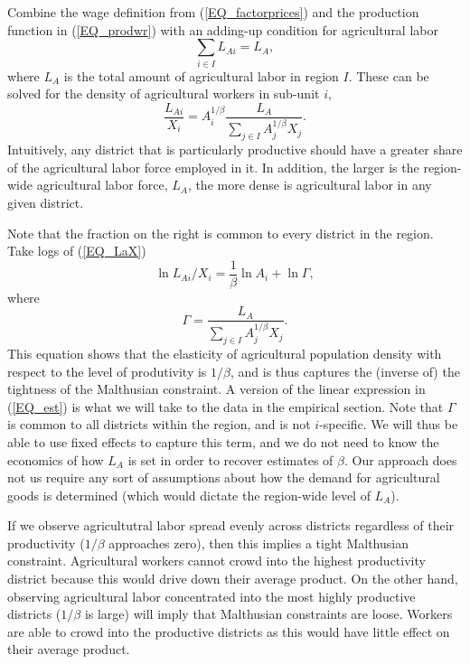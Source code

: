 \documentclass[11pt]{article}
\begin{document}
Combine the wage definition from (\ref{EQ_factorprices}) and the production function in (\ref{EQ_prodwr}) with an adding-up condition for agricultural labor 
\begin{equation}
\sum_{i\in I} L_{Ai} = L_A,
\end{equation}
where $L_A$ is the total amount of agricultural labor in region $I$. These can be solved for the density of agricultural workers in sub-unit $i$,
\begin{equation}
\frac{L_{Ai}}{X_i} = A_{i}^{1/\beta}\frac{L_A}{\sum_{j\in I} A_{j}^{1/\beta}X_{j}}. \label{EQ_LaX}
\end{equation}
Intuitively, any district that is particularly productive should have a greater share of the agricultural labor force employed in it. In addition, the larger is the region-wide agricultural labor force, $L_A$, the more dense is agricultural labor in any given district.

Note that the fraction on the right is common to every district in the region. Take logs of (\ref{EQ_LaX}) 
\begin{equation}
\ln L_{Ai}/X_i = \frac{1}{\beta} \ln A_{i} + \ln \Gamma, \label{EQ_est}
\end{equation}
where
\begin{equation}
    \Gamma = \frac{L_A}{\sum_{j\in I} A_{j}^{1/\beta}X_{j}}.
\end{equation}
This equation shows that the elasticity of agricultural population density with respect to the level of produtivity is $1/\beta$, and is thus captures the (inverse of) the tightness of the Malthusian constraint. A version of the linear expression in (\ref{EQ_est}) is what we will take to the data in the empirical section. Note that $\Gamma$ is common to all districts within the region, and is not $i$-specific. We will thus be able to use fixed effects to capture this term, and we do not need to know the economics of how $L_A$ is set in order to recover estimates of $\beta$. Our approach does not us require any sort of assumptions about how the demand for agricultural goods is determined (which would dictate the region-wide level of $L_A$).

If we observe agricultutral labor spread evenly across districts regardless of their productivity ($1/\beta$ approaches zero), then this implies a tight Malthusian constraint. Agricultural workers cannot crowd into the highest productivity district because this would drive down their average product. On the other hand, observing agricultural labor concentrated into the most highly productive districts ($1/\beta$ is large) will imply that Malthusian constraints are loose. Workers are able to crowd into the productive districts as this would have little effect on their average product.
\end{document}
